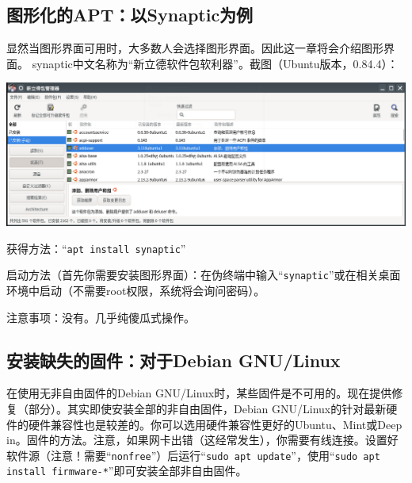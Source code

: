 \subsection{图形化的APT：以Synaptic为例}
显然当图形界面可用时，大多数人会选择图形界面。因此这一章将会介绍图形界面。
synaptic中文名称为“新立德软件包软利器”。截图（Ubuntu版本，0.84.4）：
\begin{center}
	\includegraphics[width=0.7\linewidth]{pic/synaptic.png} 	
\end{center} \par
获得方法：“\verb|apt install synaptic|” \par
启动方法（首先你需要安装图形界面）：在伪终端中输入“\verb|synaptic|”或在相关桌面环境中启动（不需要root权限，系统将会询问密码）。\par
注意事项：没有。几乎纯傻瓜式操作。
\subsection{安装缺失的固件：对于Debian GNU/Linux}
在使用无非自由固件的Debian GNU/Linux时，某些固件是不可用的。现在提供修复（部分）。其实即使安装全部的非自由固件，Debian GNU/Linux的针对最新硬件的硬件兼容性也是较差的。你可以选用硬件兼容性更好的Ubuntu、Mint或Deep in。固件的方法。注意，如果网卡出错（这经常发生），你需要有线连接。设置好软件源（注意！需要“\verb|nonfree|”）后运行“\verb|sudo apt update|”，使用“\verb|sudo apt install firmware-*|”即可安装全部非自由固件。
